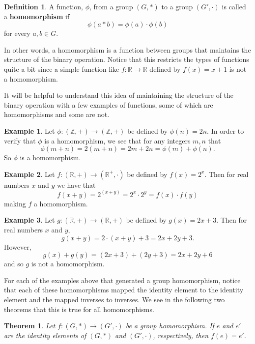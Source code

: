 \documentclass[
]{book}
\newtheorem{theorem}{Theorem}[chapter]
\theoremstyle{definition}
\newtheorem{definition}{Definition}[chapter]
\theoremstyle{definition}
\newtheorem{example}{Example}[chapter]
\theoremstyle{definition}
\theoremstyle{definition}
\theoremstyle{remark}
\begin{document}
\begin{definition}
A function, \(\phi\), from a group \((G,*)\) to a group \((G',\cdot)\) is called a \textbf{homomorphism} if \[\phi(a*b)=\phi(a) \cdot \phi(b)\] for every \(a,b\in G\).
\end{definition}

In other words, a homomorphism is a function between groups that maintains the structure of the binary operation. Notice that this restricts the types of functions quite a bit since a simple function like \(f:\mathbb{R} \rightarrow \mathbb{R}\) defined by \(f(x)=x+1\) is not a homomorphism.

It will be helpful to understand this idea of maintaining the structure of the binary operation with a few examples of functions, some of which are homomorphisms and some are not.

\begin{example}
Let \(\phi: (\mathbb{Z},+) \rightarrow (\mathbb{Z},+)\) be defined by \(\phi(n)=2n\). In order to verify that \(\phi\) is a homomorphism, we see that for any integers \(m,n\) that \[\phi(m+n)= 2(m+n) = 2m + 2n = \phi(m)+\phi(n).\] So \(\phi\) is a homomorphism.
\end{example}

\begin{example}
Let \(f: (\mathbb{R}, +) \rightarrow (\mathbb{R}^+, \cdot)\) be defined by \(f(x)=2^x\). Then for real numbers \(x\) and \(y\) we have that \[f(x+y)=2^{(x+y)} = 2^x \cdot 2^y = f(x) \cdot f(y)\] making \(f\) a homomorphism.
\end{example}

\begin{example}
Let \(g: (\mathbb{R}, +) \rightarrow (\mathbb{R},+)\) be defined by \(g(x)=2x+3\). Then for real numbers \(x\) and \(y\), \[g(x+y) = 2\cdot (x+y)+3=2x+2y+3.\] However, \[g(x)+g(y)=(2x+3)+(2y+3)= 2x+2y+6\] and so \(g\) is not a homomorphism.
\end{example}

For each of the examples above that generated a group homomorphism, notice that each of these homomorphisms mapped the identity element to the identity element and the mapped inverses to inverses. We see in the following two theorems that this is true for all homomorphisms.

\begin{theorem}
\protect\hypertarget{thm:homomorphism-identity}{}\label{thm:homomorphism-identity}Let \(f:(G,*)\rightarrow (G',\cdot)\) be a group homomorphism. If \(e\) and \(e'\) are the identity elements of \((G,*)\) and \((G',\cdot)\), respectively, then \(f(e)=e'\).
\end{theorem}
\end{document}
